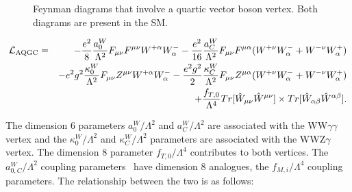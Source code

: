 \begin{figure}[htb]
  \begin{center}

    \caption{Feynman diagrams that involve a quartic vector boson vertex. Both diagrams are present in the SM.}
    \label{fig:feyndiag}
  \end{center}
\end{figure} 


\begin{eqnarray}\label{lagrangian}
{\cal L}_{\textrm{AQGC}} &=& -\dfrac{e^2}{8} \dfrac{a_0^W}{\Lambda^2} F_{\mu \nu} F^{\mu \nu} W^{+\alpha} W^-_{\alpha} - \dfrac{e^2}{16} 
\dfrac{a_C^W}{\Lambda^2} F_{\mu \nu} F^{\mu \alpha} ( W^{+\nu} W^-_{\alpha} + W^{-\nu} W^+_{\alpha} ) \nonumber \\
& &- e^2 g^2 \dfrac{\kappa_0^{W}}{\Lambda^2} F_{\mu \nu} Z^{\mu \nu} W^{+ \alpha} W^-_{\alpha}- \frac{e^2 g^2}{2} \dfrac{\kappa_C^{W}}{\Lambda^2} F_{\mu \nu} Z^{\mu \alpha} ( W^{+\nu} W^-_{\alpha} + W^{-\nu} W^+_{\alpha} )\nonumber \\ 
& &+ \dfrac{f_{T,0}}{\Lambda^4} Tr[\hat{W}_{\mu \nu} \hat{W}^{\mu \nu}] \times Tr[\hat{W}_{\alpha \beta} \hat{W}^{\alpha \beta}] .
\end{eqnarray}

The dimension 6 parameters $a_0^W/\Lambda^2$ and $a_C^W/\Lambda^2$ are
associated with the WW$\gamma\gamma$ vertex and the
$\kappa_0^W/\Lambda^2$ and $\kappa_C^W/\Lambda^2$ parameters are
associated with the WWZ$\gamma$ vertex. The dimension 8 parameter
$f_{T,0}/\Lambda^4$ contributes to both vertices. The
$a_{0,C}^W/\Lambda^2$ coupling parameters~\cite{Belanger:1999} have
dimension 8 analogues, the $f_{M,i}/\Lambda^4$ coupling parameters. The relationship between the two is as follows:

